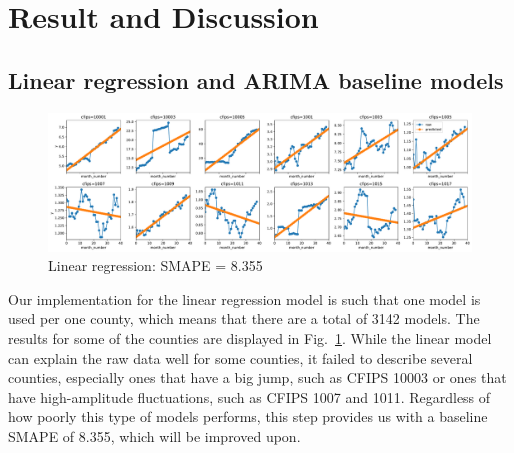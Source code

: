 \documentclass[prl,aps,superscriptaddress,twocolumn,10pt,nolongbibliography]{revtex4-2}
\begin{document}

\section{Result and Discussion}

\subsection{Linear regression and ARIMA baseline models}
\begin{figure}
\includegraphics[width=7in]{figs/linear.pdf}
\caption{\label{fig:linear}
Linear regression: SMAPE = 8.355
}
\end{figure}

Our implementation for the linear regression model is such that one model is used per one county, which means that there are a total of 3142 models. 
The results for some of the counties are displayed in Fig.~\ref{fig:linear}.
While the linear model can explain the raw data well for some counties, it failed to describe several counties, especially ones that have a big jump, such as CFIPS 10003 or ones that have high-amplitude fluctuations, such as CFIPS 1007 and 1011. 
Regardless of how poorly this type of models performs, this step provides us with a baseline SMAPE of 8.355, which will be improved upon.
\end{document}
